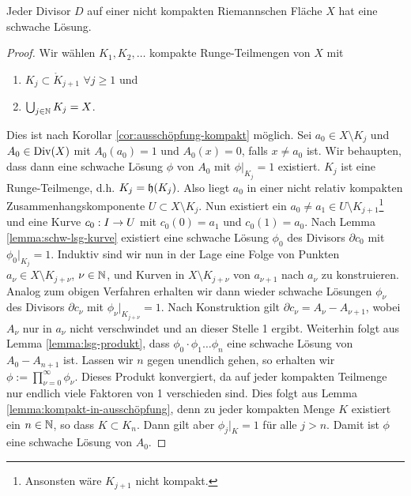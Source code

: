 \begin{lemma}
  \label{lemma:schwache-Lösung-Divisor}
  Jeder Divisor $D$ auf einer nicht kompakten Riemannschen Fläche $X$ hat eine
  schwache Lösung.
\end{lemma}

\begin{proof}
  Wir wählen $K_1, K_2, \dots$ kompakte Runge-Teilmengen von $X$ mit
  \begin{enumerate}
  \item $K_j \subset \mathring{K}_{j+1}$ $\forall j \geq 1$ und
  \item $\bigcup_{j \in \mathbb{N}} K_j = X$.
  \end{enumerate}
  Dies ist nach Korollar \ref{cor:ausschöpfung-kompakt} möglich.
  Sei $a_0 \in X \setminus K_j$ und $A_0 \in \operatorname{Div}(X)$
  mit $A_0(a_0) = 1$ und $A_0(x) = 0$, falls $x \neq a_0$ ist. Wir
  behaupten, dass dann eine schwache Lösung $\phi$ von $A_0$ mit $\phi |_{K_j}
  = 1$ existiert. 
  $K_j$ ist eine Runge-Teilmenge, d.h. $K_j = \mathfrak{h}(K_j)$. Also
  liegt $a_0$ in einer nicht relativ kompakten
  Zusammenhangskomponente $U \subset X \setminus K_j$.
  Nun existiert ein $a_0 \neq a_1 \in U \setminus K_{j+1}$\footnote{Ansonsten wäre
  $K_{j+1}$ nicht kompakt.} und eine Kurve $c_0: I \rightarrow U$ mit
  $c_0(0)=a_1$ und $c_0(1) = a_0$. 
  Nach Lemma \ref{lemma:schw-lsg-kurve} existiert eine schwache Lösung
  $\phi_0$ des Divisors $\partial c_0$ mit $\phi_0|_{K_j} = 1$. 
  Induktiv sind wir nun in der Lage eine Folge von Punkten $a_\nu \in
  X \setminus K_{j+ \nu}$, $\nu \in \mathbb{N}$, und Kurven in $X \setminus
  K_{j+\nu}$ von $a_{\nu+1}$ nach $a_\nu$ zu konstruieren. Analog zum
  obigen Verfahren erhalten wir dann wieder schwache Lösungen
  $\phi_\nu$ des Divisors $\partial c_\nu$ mit $\phi_\nu |_{K_{j+\nu}}
  = 1$. 
  Nach Konstruktion gilt $\partial c_\nu = A_\nu - A_{\nu+1}$, wobei
  $A_\nu$ nur in $a_\nu$ nicht verschwindet und an dieser Stelle 1
  ergibt.
  Weiterhin folgt aus Lemma \ref{lemma:lsg-produkt}, dass $\phi_0 \cdot \phi_1 \dots \phi_n$ eine
  schwache Lösung von $A_0 - A_{n+1}$ ist.
  Lassen wir $n$ gegen unendlich gehen, so erhalten wir $\phi :=
  \prod_{\nu = 0}^\infty \phi_\nu$. Dieses Produkt konvergiert, da
  auf jeder kompakten Teilmenge nur endlich viele Faktoren von 1
  verschieden sind. Dies folgt aus Lemma
  \ref{lemma:kompakt-in-ausschöpfung}, denn zu jeder kompakten Menge
  $K$ existiert ein $n \in \mathbb{N}$, so dass $K \subset K_n$. Dann gilt
  aber $\phi_j |_K = 1$ für alle $j > n$.
  Damit ist $\phi$ eine schwache Lösung von $A_0$.
  

\end{proof}
